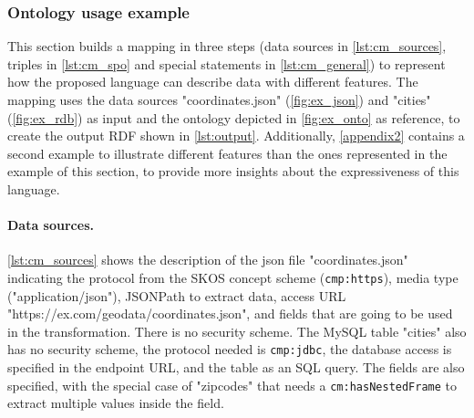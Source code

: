 








\subsubsection{Ontology usage example}\label{sec:cm_example} 


This section builds a mapping in three steps (data sources in \cref{lst:cm_sources}, triples in \cref{lst:cm_spo} and special statements in \cref{lst:cm_general}) to represent how the proposed language can describe data with different features. The mapping uses the data sources "coordinates.json" (\cref{fig:ex_json}) and "cities"(\cref{fig:ex_rdb}) as input and the ontology depicted in  \cref{fig:ex_onto} as reference, to create the output RDF shown in \cref{lst:output}. Additionally, \cref{appendix2} contains a second example to illustrate different features than the ones represented in the example of this section, to provide more insights about the expressiveness of this language.

\noindent\paragraph{\textbf{Data sources.}} \cref{lst:cm_sources} shows the description of the json file "coordinates.json" indicating the protocol from the SKOS concept scheme (\texttt{cmp:https}), media type ("application/json"), JSONPath to extract data, access URL  "https://ex.com/geodata/coordinates\-.json", and  fields that are going to be used in the transformation. There is no security scheme. The MySQL table "cities" also has no security scheme, the protocol needed is \texttt{cmp:jdbc}, the database access is specified in the endpoint URL, and the table as an SQL query. The fields are also specified, with the special case of "zipcodes" that needs a \texttt{cm:hasNestedFrame} to extract multiple values inside the field.

